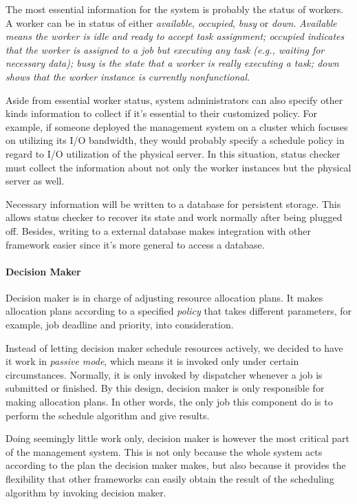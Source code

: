 The most essential information for the system is probably the status of
workers.
A worker can be in status of either \emph{available}, \emph{occupied},
\emph{busy} or \emph{down}.
\em{Available} means the worker is idle and ready to accept task 
assignment; \em{occupied} indicates that the worker is assigned to a 
job but executing any task (e.g., waiting for necessary data); \em{busy}
is the state that a worker is really executing a task; \em{down} shows 
that the worker instance is currently nonfunctional. 

Aside from essential worker status, system administrators can also
specify other kinds information to collect if it's essential to  their
customized policy.
For example, if someone deployed the management system on a cluster
which focuses on utilizing its I/O bandwidth, they would probably
specify a schedule policy in regard to I/O utilization of the physical
server.
In this situation, status checker must collect the information about
not only the worker instances but the physical server as well.

Necessary information will be written to a database for persistent
storage.
This allows status checker to recover its state and work normally after
being plugged off.
Besides, writing to a external database makes integration with other
framework easier since it's more general to access a database.

\paragraph{Decision Maker}	%

Decision maker is in charge of adjusting resource allocation plans.
It makes allocation plans according to a specified \emph{policy} that 
takes different parameters, for example, job deadline and priority, 
into consideration. 

Instead of letting decision maker schedule resources actively, we
decided to have it work in \emph{passive mode}, which means it is
invoked only under certain circumstances.
Normally, it is only invoked by dispatcher whenever a job is submitted
or finished.
By this design, decision maker is only responsible for making allocation
plans.
In other words, the only job this component do is to perform the
schedule algorithm and give results.

Doing seemingly little work only, decision maker is however the most
critical part of the management system.
This is not only because the whole system acts according to the plan the
decision maker makes, but also because it provides the flexibility that
other frameworks can easily obtain the result of the scheduling
algorithm by invoking decision maker.

